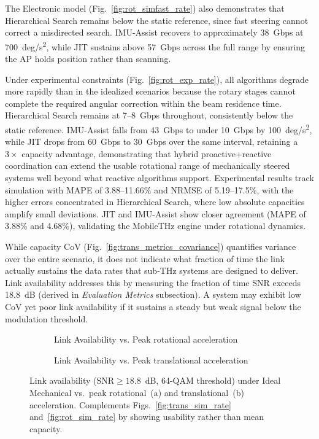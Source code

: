 \documentclass[fleqn,10pt]{wlscirep}
\begin{document}
The Electronic model (Fig.~\ref{fig:rot_simfast_rate}) also demonstrates that Hierarchical Search remains below the static reference, since fast steering cannot correct a misdirected search. IMU-Assist recovers to approximately \SI{38}{Gbps} at \SI{700}{deg/s^2}, while JIT sustains above \SI{57}{Gbps} across the full range by ensuring the AP holds position rather than scanning.

Under experimental constraints (Fig.~\ref{fig:rot_exp_rate}), all algorithms degrade more rapidly than in the idealized scenarios because the rotary stages cannot complete the required angular correction within the beam residence time. Hierarchical Search remains at \SI{7}{}--\SI{8}{Gbps} throughout, consistently below the static reference. IMU-Assist falls from \SI{43}{Gbps} to under \SI{10}{Gbps} by \SI{100}{deg/s^2}, while JIT drops from \SI{60}{Gbps} to \SI{30}{Gbps} over the same interval, retaining a $3\times$ capacity advantage, demonstrating that hybrid proactive+reactive coordination can extend the usable rotational range of mechanically steered systems well beyond what reactive algorithms support. Experimental results track simulation with MAPE of 3.88--11.66\% and NRMSE of 5.19--17.5\%, with the higher errors concentrated in Hierarchical Search, where low absolute capacities amplify small deviations. JIT and IMU-Assist show closer agreement (MAPE of 3.88\% and 4.68\%), validating the MobileTHz engine under rotational dynamics.

While capacity CoV (Fig.~\ref{fig:trans_metrics_covariance}) quantifies variance over the entire scenario, it does not indicate what fraction of time the link actually sustains the data rates that sub-THz systems are designed to deliver\cite{Dang2020, Nokia2022}. Link availability addresses this by measuring the fraction of time SNR exceeds \SI{18.8}{dB} (derived in \textit{Evaluation Metrics} subsection). A system may exhibit low CoV yet poor link availability if it sustains a steady but weak signal below the modulation threshold.

\begin{figure}[h!]
    \centering
    \begin{subfigure}{0.495\linewidth}
        
        \vspace{-25pt}
        \caption{Link Availability vs. Peak rotational acceleration}
        \label{fig:rotionalLinkAvail}
    \end{subfigure}
    \hfill
    \begin{subfigure}{0.495\linewidth}
        
        \vspace{-25pt}
        \caption{Link Availability vs. Peak translational acceleration}
        \label{fig:translationalLinkAvail}
    \end{subfigure}
    \caption{Link availability ($\mathrm{SNR} \geq 18.8$~dB, 64-QAM threshold) under Ideal Mechanical vs.\ peak rotational~(a) and translational~(b) acceleration. Complements Figs.~\ref{fig:trans_sim_rate} and~\ref{fig:rot_sim_rate} by showing usability rather than mean capacity.}
    \label{fig:accelLinkAvail}
    \vspace{-5pt}
\end{figure}
\end{document}
